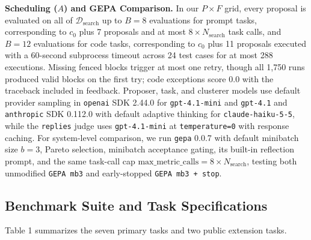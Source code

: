 \documentclass[10pt]{article}
\begin{document}
\textbf{Scheduling (\(A\)) and GEPA Comparison.} In our \(P \times F\)
grid, every proposal is evaluated on all of
\(\mathcal{D}_{\text{search}}\) up to \(B = 8\) evaluations for prompt
tasks, corresponding to \(c_0\) plus 7 proposals and at most
\(8 \times N_{\text{search}}\) task calls, and \(B = 12\) evaluations
for code tasks, corresponding to \(c_0\) plus 11 proposals executed with
a 60-second subprocess timeout across 24 test cases for at most 288
executions. Missing fenced blocks trigger at most one retry, though all
1,750 runs produced valid blocks on the first try; code exceptions score
\(0.0\) with the traceback included in feedback. Proposer, task, and
clusterer models use default provider sampling in \texttt{openai} SDK
2.44.0 for \texttt{gpt-4.1-mini} and \texttt{gpt-4.1} and
\texttt{anthropic} SDK 0.112.0 with default adaptive thinking for
\texttt{claude-haiku-5-5}, while the \texttt{replies} judge uses
\texttt{gpt-4.1-mini} at \texttt{temperature=0} with response caching.
For system-level comparison, we run \texttt{gepa} 0.0.7
\citep{a2025gepa} with default minibatch size \(b = 3\), Pareto
selection, minibatch acceptance gating, its built-in reflection prompt,
and the same task-call cap
\(\text{max\_metric\_calls} = 8 \times N_{\text{search}}\), testing both
unmodified \texttt{GEPA\ mb3} and early-stopped
\texttt{GEPA\ mb3\ +\ stop}.

\hypertarget{benchmark-suite-and-task-specifications}{%
\subsection{Benchmark Suite and Task
Specifications}\label{benchmark-suite-and-task-specifications}}

Table 1 summarizes the seven primary tasks and two public extension
tasks.
\end{document}
